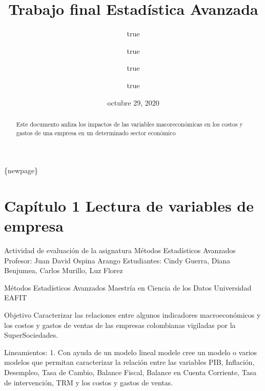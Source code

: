 \documentclass[
  11pt,
]{article}
\title{Trabajo final Estadística Avanzada}
\author{true \and true \and true \and true}
\date{octubre 29, 2020}
\begin{document}
\maketitle
\begin{abstract}
Este documento anliza los impactos de las variables macoreconómicas en
los costos y gastos de una empresa en un determinado sector económico
\end{abstract}

{
\setcounter{tocdepth}{3}
\tableofcontents
}
\{newpage\}

\hypertarget{capuxedtulo-1-lectura-de-variables-de-empresa}{%
\section{Capítulo 1 Lectura de variables de
empresa}\label{capuxedtulo-1-lectura-de-variables-de-empresa}}

Actividad de evaluación de la asignatura Métodos Estadísticos Avanzados
Profesor: Juan David Ospina Arango Estudiantes: Cindy Guerra, Diana
Benjumea, Carlos Murillo, Luz Florez

Métodos Estadísticos Avanzados Maestría en Ciencia de los Datos
Universidad EAFIT

Objetivo Caracterizar las relaciones entre algunos indicadores
macroeconómicos y los costos y gastos de ventas de las empresas
colombianas vigiladas por la SuperSociedades.

Lineamientos: 1. Con ayuda de un modelo lineal modele cree un modelo o
varios modelos que permitan caracterizar la relación entre las variables
PIB, Inflación, Desempleo, Tasa de Cambio, Balance Fiscal, Balance en
Cuenta Corriente, Tasa de intervención, TRM y los costos y gastos de
ventas.
\end{document}

